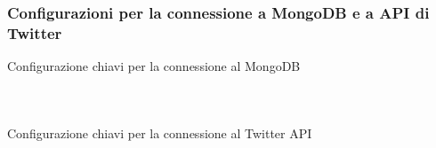 \documentclass[xcolor=svgnames, aspectratio=169]{beamer}
\begin{document}
\subsubsection{Configurazioni per la connessione a MongoDB e a API di Twitter}

\begin{frame}{Configurazione chiavi per la connessione al MongoDB}
    \begin{columns}[t]
        
        \vspace*{-32pt}
        \begin{figure}[H]
            \centering
            \noindent{}
        \end{figure}
    \end{columns}
\end{frame}


\begin{frame}{Configurazione chiavi per la connessione al Twitter API}
    \begin{columns}[t]
        
        \vspace*{-32pt}
        \begin{figure}[H]
            \centering
            \noindent{}
        \end{figure}
    \end{columns}
\end{frame}
\end{document}

